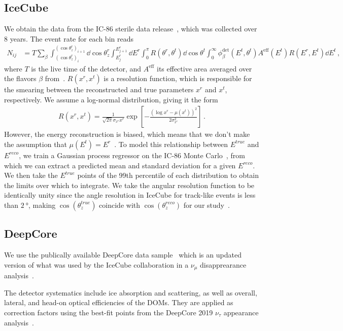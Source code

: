 \documentclass[draft=True]{revtex4-2}
\newcommand{\zreco}{\ensuremath{\cos{(\theta_z^{reco})}}}
\newcommand{\ztrue}{\ensuremath{\cos{(\theta_z^{true})}}}
\newcommand{\Ereco}{E^{reco}}
\newcommand{\Etrue}{E^{true}}
\begin{document}
\subsection{IceCube}\label{ch:ICmethod}
We obtain the data from the IC-86 sterile data release~\cite{IC2020}, which was collected over 8 years. The event rate for each bin reads
\begin{align}\label{eq:ICevents}
   N_{ij} &= T\sum_\beta \int_{(\cos{\theta_z^r})_i}^{(\cos{\theta_z^r})_{i+1}} \dd \cos{\theta^r_z} \int_{E^r_{j}}^{E^r_{j+1}} \dd E^r \int_0^\pi R(\theta^r,\theta^t) \dd \cos{\theta^t} \int_0^\infty \phi_\beta^\text{det}(E^t,\theta^t)  A^\text{eff}(E^t) R(E^r,E^t) 
   \dd E^t\,,
\end{align}
where $T$ is the live time of the detector, and $A^\text{eff}$ its effective area averaged over the flavors $\beta$ from~\cite{ICaeff}. $R(x^r,x^t)$ is a resolution function, 
which is responsible for the smearing between the reconstructed and true parameters $x^r$ and $x^t$, respectively. We assume a log-normal distribution, giving it the form 
\begin{align}
    R(x^r, x^t) = \frac{1}{\sqrt{2\pi} \sigma_{x^r}x^r} \exp\left[-\frac{(\log x^r-\mu(x^t))^2}{2\sigma_{x^r}^2}\right]\,.
\end{align}
However, the energy reconstruction is biased, which means that we don't make the assumption that $\mu(E^t) =E^r$~\cite{weaverEvidenceAstrophysicalMuon}. 
To model this relationship between $\Etrue$ and $\Ereco$, we train a Gaussian process regressor on the IC-86 Monte Carlo~\cite{IC2016}, from which
we can extract a predicted mean and standard deviation for a given $E^{reco}$. We then take the $\Etrue$ points of the 99th percentile of each distribution to obtain
the limits over which to integrate. We take the angular resolution function to be identically unity since the angle resolution in IceCube for track-like 
events is less than $\SI{2}{\degree}$, making $\ztrue$ coincide with $\zreco$ for our study~\cite{IC2020}. 

\subsection{DeepCore}\label{ch:DCmethod}
We use the publically available DeepCore data sample~\cite{DC2019data} which is an updated version of what was used by the 
IceCube collaboration in a $\nu_\mu$ disapprearance analysis~\cite{DC2018mudisappearance}.

The detector systematics include ice absorption and scattering, as well as overall, lateral, and head-on optical efficiencies of the DOMs. 
They are applied as correction factors using the best-fit points from the DeepCore 2019 $\nu_\tau$ appearance 
analysis~\cite{DC2019tauappearance}.
\end{document}
